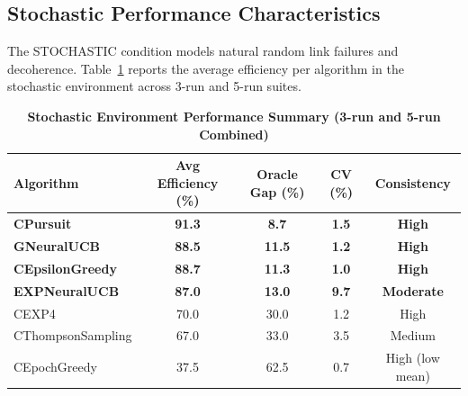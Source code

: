 \documentclass[12pt,a4paper]{article}
\newcommand{\performance}[1]{\textcolor{performancecolor}{\textbf{#1}}}
\newcommand{\stochastic}[1]{\textcolor{stochasticcolor}{\textbf{#1}}}
\newcommand{\legacy}[1]{\textcolor{legacycolor}{\textbf{#1}}}
\newcommand{\neural}[1]{\textcolor{neuralcolor}{\textbf{#1}}}
\begin{document}
\begin{tcolorbox}[colback=stochasticcolor!10,colframe=stochasticcolor,title=\textbf{Stochastic Environment Deep Analysis (1$\times$–2$\times$ Capacities, T/Tb Combined, 3-run/5-run)}]

\subsection{Stochastic Performance Characteristics}

The STOCHASTIC condition models natural random link failures and decoherence. Table~\ref{tab:stoch-performance} reports the average efficiency per algorithm in the stochastic environment across 3-run and 5-run suites.

\begin{table}[H]
\centering
\caption{\stochastic{Stochastic Environment Performance Summary (3-run and 5-run Combined)}}
\label{tab:stoch-performance}
\begin{tabular}{|l|c|c|c|c|}
\hline
\textbf{Algorithm} & \textbf{Avg Efficiency (\%)} & \textbf{Oracle Gap (\%)} & \textbf{CV (\%)} & \textbf{Consistency} \\
\hline
\hline
\stochastic{CPursuit}        & \stochastic{91.3} & \stochastic{8.7}  & \stochastic{1.5} & \stochastic{High} \\
\neural{GNeuralUCB}          & \neural{88.5} & \neural{11.5}     & \neural{1.2} & \neural{High} \\
\performance{CEpsilonGreedy} & \performance{88.7}                        & \performance{11.3} & \performance{1.0} & \performance{High} \\
\legacy{EXPNeuralUCB}        & \legacy{87.0}               & \legacy{13.0}     & \legacy{9.7}     & \legacy{Moderate} \\
CEXP4                        & 70.0                        & 30.0              & 1.2              & High \\
CThompsonSampling            & 67.0                        & 33.0              & 3.5              & Medium \\
CEpochGreedy                 & 37.5                        & 62.5              & 0.7              & High (low mean) \\
\hline
\end{tabular}
\end{table}


\end{tcolorbox}
\end{document}
